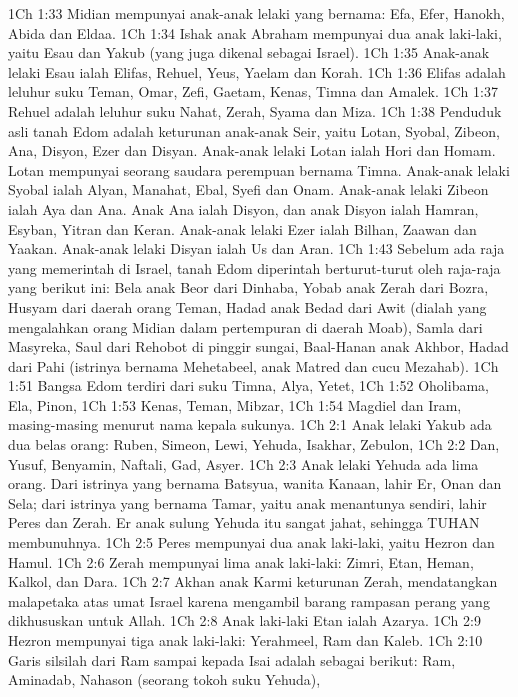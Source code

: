 1Ch 1:33  Midian mempunyai anak-anak lelaki yang bernama: Efa, Efer, Hanokh, Abida dan Eldaa.
1Ch 1:34  Ishak anak Abraham mempunyai dua anak laki-laki, yaitu Esau dan Yakub (yang juga dikenal sebagai Israel).
1Ch 1:35  Anak-anak lelaki Esau ialah Elifas, Rehuel, Yeus, Yaelam dan Korah.
1Ch 1:36  Elifas adalah leluhur suku Teman, Omar, Zefi, Gaetam, Kenas, Timna dan Amalek.
1Ch 1:37  Rehuel adalah leluhur suku Nahat, Zerah, Syama dan Miza.
1Ch 1:38  Penduduk asli tanah Edom adalah keturunan anak-anak Seir, yaitu Lotan, Syobal, Zibeon, Ana, Disyon, Ezer dan Disyan. Anak-anak lelaki Lotan ialah Hori dan Homam. Lotan mempunyai seorang saudara perempuan bernama Timna. Anak-anak lelaki Syobal ialah Alyan, Manahat, Ebal, Syefi dan Onam. Anak-anak lelaki Zibeon ialah Aya dan Ana. Anak Ana ialah Disyon, dan anak Disyon ialah Hamran, Esyban, Yitran dan Keran. Anak-anak lelaki Ezer ialah Bilhan, Zaawan dan Yaakan. Anak-anak lelaki Disyan ialah Us dan Aran.
1Ch 1:43  Sebelum ada raja yang memerintah di Israel, tanah Edom diperintah berturut-turut oleh raja-raja yang berikut ini: Bela anak Beor dari Dinhaba, Yobab anak Zerah dari Bozra, Husyam dari daerah orang Teman, Hadad anak Bedad dari Awit (dialah yang mengalahkan orang Midian dalam pertempuran di daerah Moab), Samla dari Masyreka, Saul dari Rehobot di pinggir sungai, Baal-Hanan anak Akhbor, Hadad dari Pahi (istrinya bernama Mehetabeel, anak Matred dan cucu Mezahab).
1Ch 1:51  Bangsa Edom terdiri dari suku Timna, Alya, Yetet,
1Ch 1:52  Oholibama, Ela, Pinon,
1Ch 1:53  Kenas, Teman, Mibzar,
1Ch 1:54  Magdiel dan Iram, masing-masing menurut nama kepala sukunya.
1Ch 2:1  Anak lelaki Yakub ada dua belas orang: Ruben, Simeon, Lewi, Yehuda, Isakhar, Zebulon,
1Ch 2:2  Dan, Yusuf, Benyamin, Naftali, Gad, Asyer.
1Ch 2:3  Anak lelaki Yehuda ada lima orang. Dari istrinya yang bernama Batsyua, wanita Kanaan, lahir Er, Onan dan Sela; dari istrinya yang bernama Tamar, yaitu anak menantunya sendiri, lahir Peres dan Zerah. Er anak sulung Yehuda itu sangat jahat, sehingga TUHAN membunuhnya.
1Ch 2:5  Peres mempunyai dua anak laki-laki, yaitu Hezron dan Hamul.
1Ch 2:6  Zerah mempunyai lima anak laki-laki: Zimri, Etan, Heman, Kalkol, dan Dara.
1Ch 2:7  Akhan anak Karmi keturunan Zerah, mendatangkan malapetaka atas umat Israel karena mengambil barang rampasan perang yang dikhususkan untuk Allah.
1Ch 2:8  Anak laki-laki Etan ialah Azarya.
1Ch 2:9  Hezron mempunyai tiga anak laki-laki: Yerahmeel, Ram dan Kaleb.
1Ch 2:10  Garis silsilah dari Ram sampai kepada Isai adalah sebagai berikut: Ram, Aminadab, Nahason (seorang tokoh suku Yehuda),
